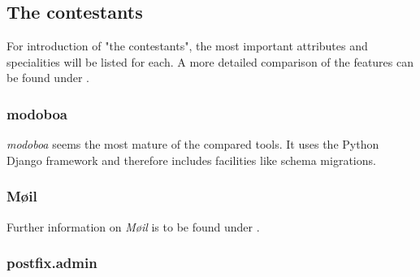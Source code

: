 \documentclass[12pt,a4paper]{scrartcl}
\begin{document}
		\subsection*{The contestants}
			For introduction of "the contestants", the most important
			attributes and specialities will be listed for each. A more
			detailed comparison of the features can be found under
			.

			\subsubsection*{modoboa}

				\emph{modoboa} seems the most mature of the compared tools. It
				uses the Python Django framework and therefore includes
				facilities like schema migrations.


			\subsubsection*{Møil}
				
				Further information on \emph{Møil} is to be found under
				.

			\subsubsection*{postfix.admin}
			\label{sec:contestants:postfix.admin}


\end{document}
